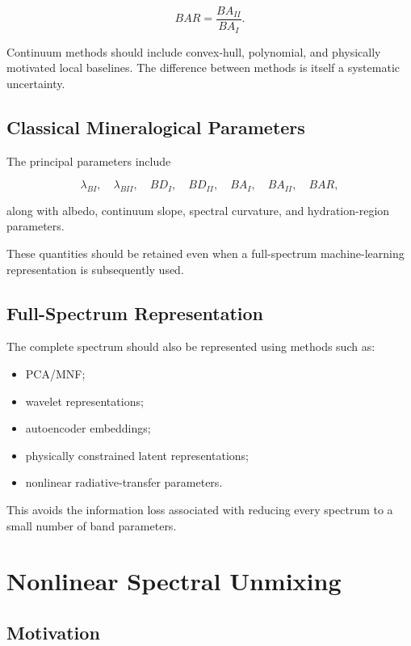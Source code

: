 \documentclass[11pt,a4paper]{article}
\begin{document}
\begin{equation}
BAR
=
\frac{BA_{II}}{BA_I}.
\end{equation}

Continuum methods should include convex-hull, polynomial, and physically motivated local baselines. The difference between methods is itself a systematic uncertainty.

\subsection{Classical Mineralogical Parameters}

The principal parameters include

\[
\lambda_{BI},\quad
\lambda_{BII},\quad
BD_I,\quad
BD_{II},\quad
BA_I,\quad
BA_{II},\quad
BAR,
\]

along with albedo, continuum slope, spectral curvature, and hydration-region parameters.

These quantities should be retained even when a full-spectrum machine-learning representation is subsequently used.

\subsection{Full-Spectrum Representation}

The complete spectrum should also be represented using methods such as:

\begin{itemize}
    \item PCA/MNF;
    \item wavelet representations;
    \item autoencoder embeddings;
    \item physically constrained latent representations;
    \item nonlinear radiative-transfer parameters.
\end{itemize}

This avoids the information loss associated with reducing every spectrum to a small number of band parameters.

\section{Nonlinear Spectral Unmixing}

\subsection{Motivation}
\end{document}
